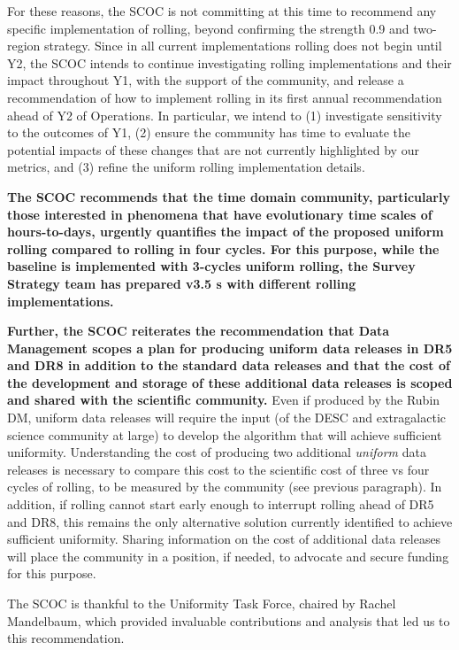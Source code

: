For these reasons, the SCOC is not committing at this time to recommend any specific implementation of rolling, beyond confirming the strength 0.9 and two-region strategy. Since in all current implementations
rolling does not begin until Y2, the SCOC intends to continue investigating rolling implementations and their impact throughout Y1, with the support of the community, and release a recommendation of how to implement rolling in its first annual recommendation ahead of Y2 of Operations. In particular, we intend to (1) investigate sensitivity to the outcomes of Y1, (2) ensure the community has time to evaluate the potential impacts of these changes that are not currently highlighted by our metrics, and (3) refine the uniform rolling implementation details.

{\bf The SCOC recommends that the time domain community, particularly those interested in phenomena that have evolutionary time scales of hours-to-days, urgently quantifies the impact of the proposed uniform rolling compared to rolling in four cycles. For this purpose, while the baseline is implemented with 3-cycles uniform rolling, the Survey Strategy team has prepared v3.5 \opsim s  with different rolling implementations.}

{\bf Further, the SCOC reiterates the recommendation that Data Management scopes a plan for producing uniform data releases in DR5 and DR8 in addition to the standard data releases and that the cost of the development and storage of these additional data releases is scoped and shared with the scientific community.} Even if produced by the Rubin DM, uniform data releases will require the input (of the DESC and extragalactic science community at large) to develop the algorithm that will achieve sufficient uniformity. Understanding the cost of producing two additional {\it uniform} data releases is necessary to compare this cost to the scientific cost of three vs four cycles of rolling, to be measured by the community (see previous paragraph). In addition, if rolling cannot start early enough to interrupt rolling ahead of DR5 and DR8, this remains the only alternative solution currently identified to achieve sufficient uniformity. Sharing information on the cost of additional data releases will place the community in a position, if needed, to advocate and secure funding for this purpose.

The SCOC is thankful to the Uniformity Task Force, chaired by Rachel Mandelbaum, which provided invaluable contributions and analysis that led us to this recommendation.

